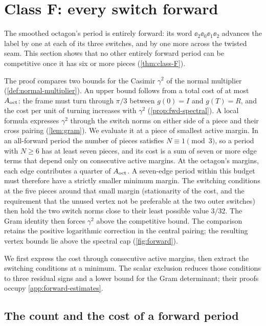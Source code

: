 \section{Class F: every switch forward}\label{sec:forward}

The smoothed octagon's period is entirely forward: its word $\ee_2\ee_0\ee_1\ee_2$ advances the
label by one at each of its three switches, and by one more across the twisted seam. This section
shows that no other entirely forward period can be competitive once it has six or more pieces (\cref{thm:class-F}).



The proof compares two bounds for the Casimir $\gamma^2$ of the normal multiplier
(\cref{def:normal-multiplier}). An upper bound follows from a total cost of at most $A_{\mathrm{oct}}$: the
frame must turn through $\pi/3$ between $g(0)=I$ and $g(T)=R$, and the cost per unit of turning
increases with $\gamma^2$ (\cref{prop:fwd-spectral}). A local formula expresses $\gamma^2$ through
the switch norms on either side of a piece and their cross pairing (\cref{lem:gram}). We evaluate
it at a piece of smallest active margin. In an all-forward period the number of pieces satisfies
$N\equiv1\pmod 3$, so a period with $N\ge6$ has at least seven pieces, and its cost is a sum of
seven or more edge terms that depend only on consecutive active margins. At the octagon's margins,
each edge contributes a quarter of $A_{\mathrm{oct}}$. A seven-edge period within this budget must therefore
have a strictly smaller minimum margin. The switching conditions at the five pieces around that
small margin (stationarity of the cost, and the requirement that the unused vertex not be
preferable at the two outer switches) then hold the two switch norms close to their least possible
value $3/32$. The Gram identity then forces $\gamma^2$ above the competitive bound. The comparison
retains the positive logarithmic correction in the central pairing; the resulting vertex bounds
lie above the spectral cap (\cref{fig:forward}).

We first express the cost through consecutive active margins, then extract the switching
conditions at a minimum. The scalar exclusion reduces those conditions to three residual signs
and a lower bound for the Gram determinant; their proofs occupy
\cref{app:forward-estimates}.

\subsection{The count and the cost of a forward period}

